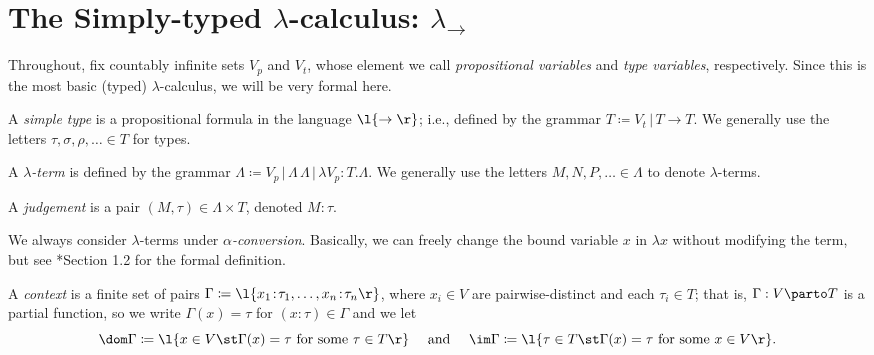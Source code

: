 \documentclass[reqno]{amsart}
\begin{document}
    \section{The Simply-typed $\lambda$-calculus: $\lambda_\rightarrow$}

    Throughout, fix countably infinite sets $V_p$ and $V_t$, whose element we call \textit{propositional variables} and \textit{type variables}, respectively. Since this is the most basic (typed) $\lambda$-calculus, we will be very formal here.

    \begin{definition}
        A \textit{simple type} is a propositional formula in the language $\l\{\rightarrow\r\}$; i.e., defined by the grammar $T\coloneqq V_t\,|\,T\rightarrow T$. We generally use the letters $\tau,\sigma,\rho,\ldots\in T$ for types.
    \end{definition}

    \begin{definition}
        A \textit{$\lambda$-term} is defined by the grammar $\Lambda\coloneqq V_p\,|\,\Lambda\,\Lambda\,|\,\lambda V_p\!:\!T.\Lambda$. We generally use the letters $M,N,P,\ldots\in\Lambda$ to denote $\lambda$-terms.
    \end{definition}

    \begin{definition}
        A \textit{judgement} is a pair $(M,\tau)\in\Lambda\times T$, denoted $M\!:\!\tau$.
    \end{definition}

    \begin{remark}
        We always consider $\lambda$-terms under \textit{$\alpha$-conversion}. Basically, we can freely change the bound variable $x$ in $\lambda x$ without modifying the term, but see \cite{SU06}*{Section 1.2} for the formal definition.
    \end{remark}

    \begin{definition}
        A \textit{context} is a finite set of pairs $\Gamma\coloneqq\l\{x_1\!:\!\tau_1,\dots,x_n\!:\!\tau_n\r\}$, where $x_i\in V$ are pairwise-distinct and each $\tau_i\in T$; that is, $\Gamma:V\parto T$ is a partial function, so we write $\Gamma(x)=\tau$ for $(x\!:\!\tau)\in\Gamma$ and we let
        \begin{equation*}
            \dom\Gamma\coloneqq\l\{x\in V\st\Gamma(x)=\tau\textrm{ for some }\tau\in T\r\}\ \ \ \ \textrm{and}\ \ \ \ \im\Gamma\coloneqq\l\{\tau\in T\st\Gamma(x)=\tau\textrm{ for some }x\in V\r\}.
        \end{equation*}
    \end{definition}
\end{document}
